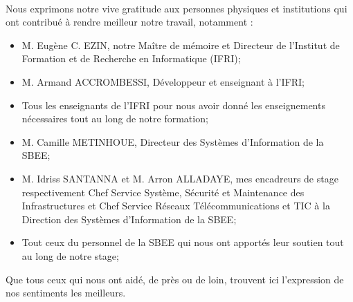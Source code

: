 \remerciements


\paragraph{}
      Nous exprimons notre vive gratitude aux personnes physiques et institutions qui ont contribué à rendre meilleur notre travail,
   notamment :
  \begin{itemize}
   \item M. Eugène C. EZIN,  notre Maître de mémoire et Directeur de l'Institut de Formation et de Recherche en Informatique (IFRI);
   \item M. Armand ACCROMBESSI, D\'eveloppeur et enseignant à l'IFRI;
   \item Tous les enseignants de l'IFRI pour nous avoir donn\'e les enseignements n\'ecessaires tout au long de notre formation;
   \item M. Camille METINHOUE, Directeur des Syst\`emes d'Information de la SBEE;
   \item M. Idriss SANTANNA et M. Arron ALLADAYE, mes encadreurs  de stage respectivement Chef Service Syst\`eme, S\'ecurit\'e et Maintenance des Infrastructures et Chef Service R\'eseaux T\'el\'ecommunications et TIC \`a la  Direction des Syst\`emes d'Information de la SBEE;
   \item Tout ceux du personnel de la SBEE qui nous ont apport\'es leur soutien tout au long de notre stage;
  \end{itemize}
    Que tous ceux qui nous ont aidé, de près ou de loin, trouvent ici l'expression de nos sentiments les meilleurs.